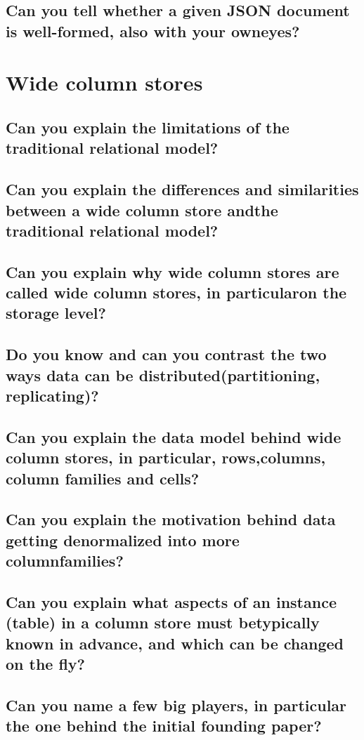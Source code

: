 \documentclass{article}
\begin{document}
\subsection{Can you tell whether a given JSON document is well-formed, also with your owneyes?}

\pagebreak

\section{Wide column stores}
\subsection{Can you explain the limitations of the traditional relational model?}
\subsection{Can you explain the differences and similarities between a wide column store andthe traditional relational model?}
\subsection{Can you explain why wide column stores are called wide column stores, in particularon the storage level?}
\subsection{Do you know and can you contrast the two ways data can be distributed(partitioning, replicating)?}
\subsection{Can you explain the data model behind wide column stores, in particular, rows,columns, column families and cells?}
\subsection{Can you explain the motivation behind data getting denormalized into more columnfamilies?}
\subsection{Can you explain what aspects of an instance (table) in a column store must betypically known in advance, and which can be changed on the fly?}
\subsection{Can you name a few big players, in particular the one behind the initial founding paper?}
\end{document}
